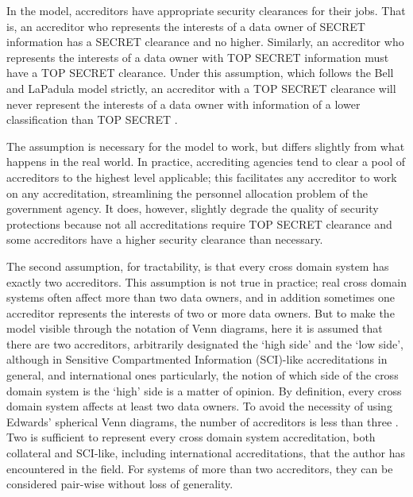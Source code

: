 \documentclass[10pt,letterpaper,conference]{IEEEtran}
\begin{document}
In the model, accreditors have appropriate security clearances for their jobs. That is, an
accreditor who represents the interests of a data owner of SECRET information has
a SECRET clearance and no higher. Similarly, an accreditor who represents the interests of a data
owner with TOP SECRET information must have a TOP SECRET clearance. Under this assumption, which
follows the Bell and LaPadula model strictly, an accreditor with a TOP SECRET clearance will never
represent the interests of a data owner with information of a lower classification than TOP SECRET
\cite{Bell1973}.

The assumption is necessary for the model to work, but differs slightly from what happens in the
real world. In practice, accrediting agencies tend to clear a pool of accreditors to the highest
level applicable; this facilitates any accreditor to work on any accreditation, streamlining the
personnel allocation problem of the government agency. It does, however, slightly degrade the
quality of security protections because not all accreditations require TOP SECRET clearance and
some accreditors have a higher security clearance than necessary.

The second assumption, for tractability, is that every cross domain system has exactly two
accreditors. This assumption is not true in practice; real cross domain systems often affect
more than two
data owners, and in addition sometimes one accreditor represents the interests of two or more data
owners. But to make the model visible through the notation of Venn diagrams, here it is assumed
that there are two accreditors, arbitrarily designated the `high side' and the `low side', although
in Sensitive Compartmented Information (SCI)-like accreditations in general, and international ones
particularly, the notion of which side of the cross domain system is the `high' side is a matter
of opinion. By definition, every cross domain system affects at least two data owners. To avoid
the necessity of using Edwards' spherical Venn diagrams, the number of accreditors is less than
three \cite{Edwards2004}. Two is sufficient to represent every cross domain system accreditation,
both collateral and SCI-like, including international accreditations, that the author has
encountered in the field. For systems of more than two accreditors, they can be considered
pair-wise without loss of generality.
\end{document}
